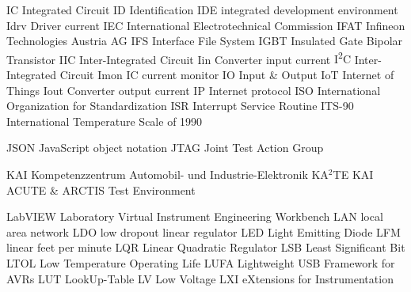 			{IC}		{Integrated Circuit}
			{ID}		{Identification}
		{IDE}		{integrated development environment}
		{Idrv}		{Driver current}
		{IEC}		{International Electrotechnical Commission}
		{IFAT}		{Infineon Technologies Austria AG}
		{IFS}		{Interface File System}
		{IGBT}		{Insulated Gate Bipolar Transistor}
		{IIC}		{Inter-Integrated Circuit}
		{Iin}		{Converter input current}
		{I\textsuperscript{2}C}	{Inter-Integrated Circuit}
			{Imon}		{IC current monitor}
			{IO}		{Input \& Output}
		{IoT}		{Internet of Things}
		{Iout}		{Converter output current}
		{IP}		{Internet protocol}
		{ISO}		{International Organization for Standardization}
		{ISR}		{Interrupt Service Routine}
		{ITS-90}	{International Temperature Scale of 1990}

					{JSON}		{JavaScript object notation}
		{JTAG}		{Joint Test Action Group}

		{KAI}		{Kompetenzzentrum Automobil- und Industrie-Elektronik}
		{KA$^2$TE}	{{\acrshort{KAI}} {\acrshort{ACUTE}} \& {\acrshort{ARCTIS}} Test Environment}

	{LabVIEW}	{Laboratory Virtual Instrument Engineering Workbench}
		{LAN}		{local area network}
		{LDO}		{low dropout linear regulator}
		{LED}		{Light Emitting Diode}
		{LFM}		{linear feet per minute}
		{LQR}		{Linear Quadratic Regulator}
		{LSB}		{Least Significant Bit}
		{LTOL}		{Low Temperature Operating Life}
		{LUFA}		{Lightweight USB Framework for AVRs}
		{LUT}			{LookUp-Table}
			{LV}		{Low Voltage}
		{LXI}		{{} eXtensions for Instrumentation}

